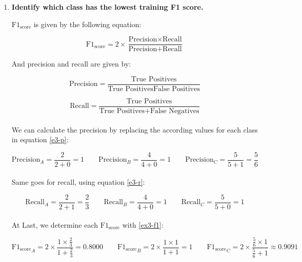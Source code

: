\documentclass[12pt]{article}
\begin{document}
\begin{enumerate}[leftmargin=\labelsep]
\item \textbf{Identify which class has the lowest training F1 score.} 

\vspace{1em}

\(\text{F1}_{\text{score}}\) is given by the following equation:

    \begin{equation}\label{ex3-f1}
        \text{F1}_{\text{score}} = 2 \times \frac{{\text{Precision} \times \text{Recall}}}{{\text{Precision} + \text{Recall}}}
    \end{equation}

\newpage

And precision and recall are given by:

    \begin{equation}\label{e3-p}
        \text{Precision} = \frac{\text{True Positives}}{{\text{True Positives}
        \text{False Positives}}}
    \end{equation}

    \begin{equation}\label{e3-r}
        \text{Recall} = \frac{\text{True Positives}}{{\text{True Positives} + \text{False Negatives}}}
    \end{equation}
\\

We can calculate the precision by replacing the according values for each class in equation \eqref{e3-p}:

    \begin{equation*}
        \text{Precision}_A = \frac{2}{2+0} = 1 \qquad
        \text{Precision}_B = \frac{4}{4+0} = 1 \qquad
        \text{Precision}_C = \frac{5}{5+1} = \frac{5}{6}
    \end{equation*}
\\

Same goes for recall, using equation \eqref{e3-r}:

    \begin{equation*}
        \text{Recall}_A = \frac{2}{2+1} =  \frac{2}{3}\qquad
        \text{Recall}_B = \frac{4}{4+0} = 1\qquad
        \text{Recall}_C = \frac{5}{5+0} = 1
    \end{equation*}
\\

At Last, we determine each \(\text{F1}_{\text{score}}\) with \eqref{ex3-f1}:

    \begin{equation*}
        \displaystyle
        {\text{F1}_{\text{score}}}_A = 2 \times \frac{{ 1 \times \frac{2}{3} }}{{  1 + \frac{2}{3} }} = 0.8000 \qquad
        {\text{F1}_{\text{score}}}_B = 2 \times \frac{{ 1 \times 1 }}{{ 1 + 1 }} = 1  \qquad
        {\text{F1}_{\text{score}}}_C = 2 \times \frac{{ \frac{5}{6} \times 1 }}{{ \frac{5}{6} + 1 }} \approx 0.9091 
    \end{equation*}
\\


\end{enumerate}
\end{document}
